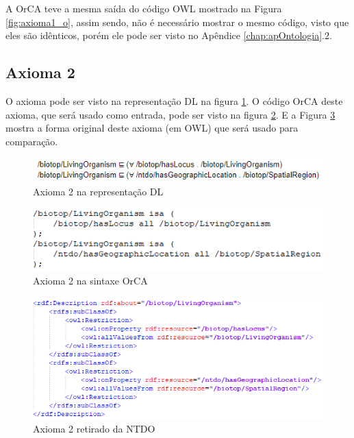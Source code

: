 \documentclass{bcc}
\begin{document}
A OrCA teve a mesma saída do código OWL mostrado na Figura \ref{fig:axioma1_o}, assim sendo, não é necessário mostrar o mesmo código, visto que eles são idênticos, porém ele pode ser visto no Apêndice \ref{chap:apOntologia}.2.





\subsection{Axioma 2}
O axioma pode ser visto na representação DL na figura \ref{fig:axioma2_dl}. O código OrCA deste axioma, que será usado como entrada, pode ser visto na figura \ref{fig:axioma2_orca}. E a Figura \ref{fig:axioma2_o} mostra a forma original deste axioma (em OWL) que será usado para comparação. 

\begin{figure}[H]
\centering
\includegraphics[width=.7\textwidth]{Figuras/axioma2_dl.png}
\caption{Axioma 2 na representação DL} 
\label{fig:axioma2_dl}
\end{figure}

\begin{figure}[H]
\centering
\includegraphics[width=.7\textwidth]{Figuras/axioma2_orca.png}
\caption{Axioma 2 na sintaxe OrCA} 
\label{fig:axioma2_orca}
\end{figure}

\begin{figure}[H]
\centering
\includegraphics[width=.8\textwidth]{Figuras/axioma2_o.png}
\caption{Axioma 2 retirado da NTDO} 
\label{fig:axioma2_o}
\end{figure}
\end{document}
